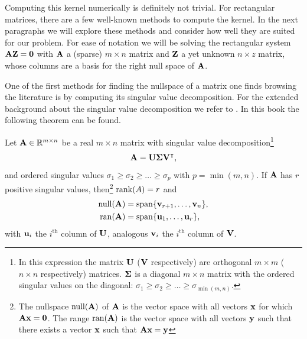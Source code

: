 Computing this kernel numerically is definitely not trivial. For rectangular matrices, there are a few well-known methods to compute the kernel. In the next paragraphs we will explore these methods and consider how well they are suited for our problem. For ease of notation we will be solving the rectangular system $\vb{A} \vb{Z} = \vb{0}$ with $\vb{A}$ a (sparse) $m\times n$ matrix and $\vb{Z}$ a yet unknown $n \times z$ matrix, whose columns are a basis for the right null space of $\vb{A}$.

One of the first methods for finding the nullspace of a matrix one finds browsing the literature is by computing its singular value decomposition. For the extended background about the singular value decomposition we refer to \cite[section~2.4]{golub_matrix_2013}. In this book the following theorem can be found.

\begin{theorem}
    Let $\vb{A} \in \mathbb{R}^{m \times n}$ be a real $m \times n$ matrix with singular value decomposition\footnote{In this expression the matrix $\vb{U}$ ($\vb{V}$ respectively) are orthogonal $m \times m$ ($n \times n$ respectively) matrices. $\vb{\Sigma}$ is a diagonal $m \times n$ matrix with the ordered singular values on the diagonal: $\sigma_1 \geq \sigma_2 \geq \dots \geq \sigma_{\min(m, n)}$. }
    $$
        \vb{A} = \vb{U}\vb{\Sigma}{\vb{V}}^\intercal\text{,}
    $$
    and ordered singular values $\sigma_1 \geq \sigma_2 \geq \dots \geq \sigma_p$ with $p = \min(m, n)$.
    If $\vb{A}$ has $r$ positive singular values, then\footnote{The nullspace $\operatorname{null}(\vb{A})$ of $\vb{A}$ is the vector space with all vectors $\vb{x}$ for which $\vb{A} \vb{x} = \vb{0}$. The range $\operatorname{ran}(\vb{A})$ is the vector space with all vectors $\vb{y}$ such that there exists a vector $\vb{x}$ such that $\vb{A}\vb{x} = \vb{y}$} $\operatorname{rank}(A) = r$ and
    \begin{align*}
        \operatorname{null}(\vb{A}) & = \operatorname{span}\{\vb{v}_{r+1}, \dots, \vb{v}_{n}\}\text{,} \\
        \operatorname{ran}(\vb{A})  & = \operatorname{span}\{\vb{u}_{1}, \dots, \vb{u}_{r}\}\text{,}
    \end{align*}
    with $\vb{u}_i$ the $i^\text{th}$ column of $\vb{U}$, analogous $\vb{v}_i$ the $i^\text{th}$ column of $\vb{V}$.
\end{theorem}

